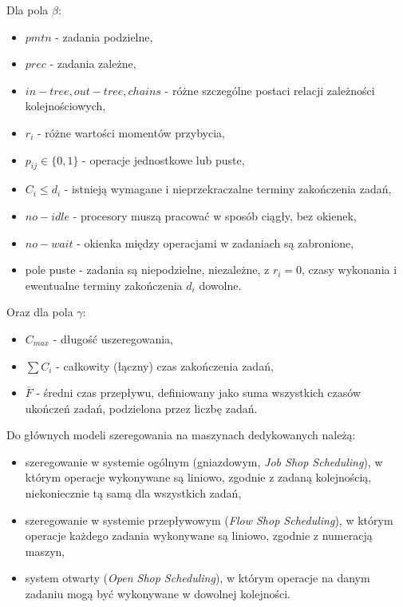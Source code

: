 \documentclass[brudnopis]{xmgr}
\begin{document}
Dla pola $\beta$:
\begin{itemize}
    \item $pmtn$ - zadania podzielne,
    \item $prec$ - zadania zależne,
    \item $in-tree, out-tree, chains$ - różne szczególne postaci relacji zależności kolejnościowych,
    \item $r_i$ - różne wartości momentów przybycia,
    \item $p_{ij}\in\{0,1\}$ - operacje jednostkowe lub puste,
    \item $C_i\leq d_i$ - istnieją wymagane i nieprzekraczalne terminy zakończenia zadań,
    \item $no-idle$ - procesory muszą pracować w sposób ciągły, bez okienek,
    \item $no-wait$ - okienka między operacjami w zadaniach są zabronione,
    \item pole puste - zadania są niepodzielne, niezależne, z $r_i=0$, czasy wykonania i ewentualne terminy zakończenia $d_i$ dowolne.
\end{itemize}

Oraz dla pola $\gamma$:
\begin{itemize}
    \item $C_{max}$ - długość uszeregowania,
    \item $\sum{C_i}$ - całkowity (łączny) czas zakończenia zadań,
    \item $\bar{F}$ - średni czas przepływu, definiowany jako suma wszystkich czasów ukończeń zadań, podzielona przez liczbę zadań.
\end{itemize}


Do głównych modeli szeregowania na maszynach dedykowanych należą:
\begin{itemize}
    \item szeregowanie w systemie ogólnym (gniazdowym, \emph{Job Shop Scheduling}), w którym operacje wykonywane są liniowo, zgodnie z zadaną kolejnością, niekoniecznie tą samą dla wszystkich zadań,
    \item szeregowanie w systemie przepływowym (\emph{Flow Shop Scheduling}), w którym operacje każdego zadania wykonywane są liniowo, zgodnie z numeracją maszyn,
    \item system otwarty (\emph{Open Shop Scheduling}), w którym operacje na danym zadaniu mogą być wykonywane w dowolnej kolejności.
\end{itemize}
\end{document}
